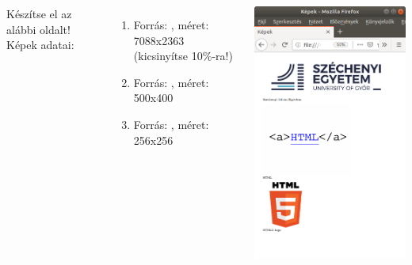\begin{frame}
  \begin{columns}[c]
      Készítse el az alábbi oldalt! Képek adatai:
      \begin{enumerate}
        \item Forrás: , méret: 7088x2363 (kicsinyítse 10\%-ra!)
        \item Forrás: , méret: 500x400
        \item Forrás: , méret: 256x256
      \end{enumerate}
        \begin{center}
          \begin{exampleblock}{}
            \centering \includegraphics[scale=.14]{kep.png}
          \end{exampleblock}
        \end{center}
  \end{columns}  
\end{frame}

